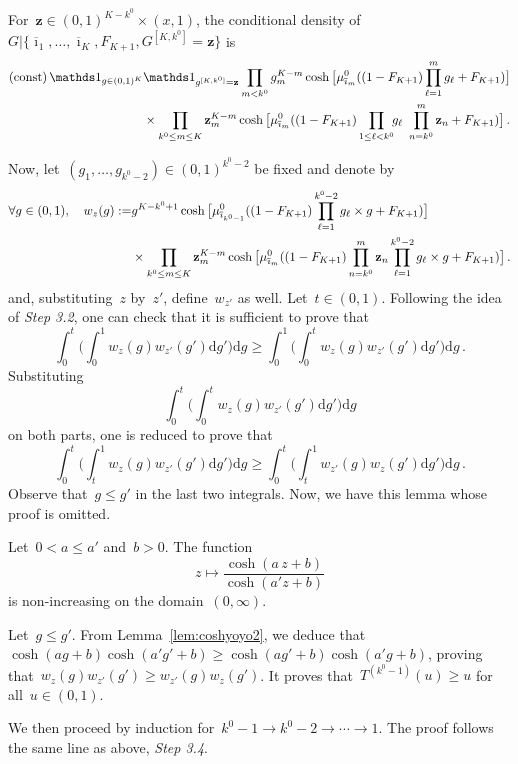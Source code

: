 \documentclass[final,numbib]{imaiai}%
\numberwithin{equation}{section}
\def\bz{\mathbf{z}}
\renewcommand{\bar}{\overline}
\def\\bUnif{\text{\bUnif}}
\newcommand{\<}{\langle}
\renewcommand{\>}{\rangle}
\newcommand{\1}{\mathds{1}}
\begin{document}
{For~$\bz\in(0,1)^{K-k^0}\times(x,1)$, the conditional density of~$G|\{\bar \imath_1,\ldots,\bar \imath_K,F_{K+1}, G^{[K,k^0]}=\bz\}$ is
 \begin{align}
 \mathrm{(const)}\,\mathds 1_{g\in(0,1)^K}&\mathds 1_{g^{[K,k^0]}=\bz}
 \prod_{m< k^0}g_m^{K-m}\cosh\big[{\mu^0_{\bar\imath_m}}((1-F_{K+1})\prod_{\ell=1}^mg_\ell+F_{K+1})\big]\notag\\
 &\times \prod_{k^0\leq m\leq K}\bz_m^{K-m}\cosh\big[{\mu^0_{\bar\imath_m}}((1-F_{K+1})\prod_{1\leq \ell<k^0}\!\!g_\ell\,\,\prod_{n=k^0}^m\bz_n+F_{K+1})\big]\,.\notag
 \end{align}

\noindent
Now, let~$(g_1,\ldots,g_{k^0-2})\in(0,1)^{k^0-2}$ be fixed and denote by
 \begin{align}
\forall g\in(0,1),\quad
w_{z}(g):=&g^{K-k^0+1}\cosh\big[{\mu^0_{\bar\imath_{k^0-1}}}((1-F_{K+1})\prod_{\ell=1}^{k^0-2}g_\ell\times g+F_{K+1})\big]\notag\\
 &\times \prod_{k^0\leq m\leq K}\bz_m^{K-m}\cosh\big[{\mu^0_{\bar\imath_m}}((1-F_{K+1})\prod_{n=k^0}^m\bz_n\prod_{\ell=1}^{k^0-2}g_\ell\times g+F_{K+1})\big]\,.\notag
 \end{align}
 and, substituting~$z$ by~$z'$, define~$w_{z'}$ as well. Let~$t\in(0,1)$. Following the idea of  {\it Step 3.2}, one can check that it is sufficient to prove that
 \[
 \int_0^t\Big(\int_0^1w_{z}(g)w_{z'}(g')\mathrm dg'\Big)\mathrm dg
 \geq
  \int_0^1\Big(\int_0^tw_{z}(g)w_{z'}(g')\mathrm dg'\Big)\mathrm dg\,.
 \]
 Substituting 
 \[
  \int_0^t\Big(\int_0^tw_{z}(g)w_{z'}(g')\mathrm dg'\Big)\mathrm dg
 \]
 on both parts, one is reduced to prove that
  \[
 \int_0^t\Big(\int_t^1w_{z}(g)w_{z'}(g')\mathrm dg'\Big)\mathrm dg
 \geq
\int_0^t\Big(\int_t^1w_{z'}(g)w_{z}(g')\mathrm dg'\Big)\mathrm dg\,.
 \]
 Observe that~$g\leq g'$ in the last two integrals. Now, we have this lemma whose proof is omitted. 
 \begin{lemma}
\label{lem:coshyoyo2}
Let~$0<a\leq a'$ and~$b>0$. The function 
\[
z\mapsto\frac{\cosh(a\, z+b)}{\cosh(a'z+b)}
\]
is non-increasing on the domain~$(0,\infty)$.
\end{lemma}

\noindent
Let~$g\leq g'$. From Lemma~\ref{lem:coshyoyo2}, we deduce that~$\cosh(a g+b)\cosh(a' g'+b)\geq \cosh(a g'+b)\cosh(a' g+b)$, proving that~$w_{z}(g)w_{z'}(g')\geq w_{z'}(g)w_{z}(g')$. It proves that~$T^{(k^0-1)}(u)\geq u$ for all~$u\in(0,1)$.

We then proceed by induction for~$k^0-1\to k^0-2\to\cdots\to 1$. The proof follows the same line as above, {\it Step 3.4}.


}
\end{document}

